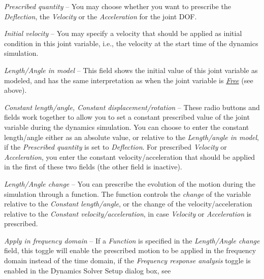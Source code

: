 \begin{bulletlist}
\item{\sl Prescribed quantity} --
  You may choose whether you want to prescribe the {\sl Deflection},
  the {\sl Velocity} or the {\sl Acceleration} for the joint DOF.

\item{\sl Initial velocity} --
  You may specify a velocity that should be applied as initial condition in this
  joint variable, i.e., the velocity at the start time of
  the dynamics simulation.

\item{\sl Length/Angle in model} --
  This field shows the initial value of this joint variable as modeled,
  and has the same interpretation as when the joint variable is
  \protect\hyperlink{free-joint-var}{\sl Free} (see above).

\item{\sl Constant length/angle, Constant displacement/rotation} --
  These radio buttons and fields work together to allow you to set a constant
  prescribed value of the joint variable during the dynamics simulation.
  You can choose to enter the constant length/angle either as an absolute value,
  or relative to the {\sl Length/angle in model},
  if the {\sl Prescribed quantity} is set to {\sl Deflection}.
  For prescribed {\sl Velocity} or {\sl Acceleration}, you enter the constant
  velocity/acceleration that should be applied in the first of these two fields
  (the other field is inactive).


\item{\sl Length/Angle change} --
  You can prescribe the evolution of the motion during the simulation through
  a function. The function controls the {\sl change} of the variable relative to
  the {\sl Constant length/angle}, or the change of the velocity/acceleration
  relative to the {\sl Constant velocity/acceleration},
  in case {\sl Velocity} or {\sl Acceleration} is prescribed.

\item{\sl Apply in frequency domain} --
  If a {\sl Function} is specified in the {\sl Length/Angle change} field,
  this toggle will enable the prescribed motion to be applied in the frequency
  domain instead of the time domain, if the {\sl Frequency response analysis}
  toggle is enabled in the Dynamics Solver Setup dialog box, see
\end{bulletlist}

